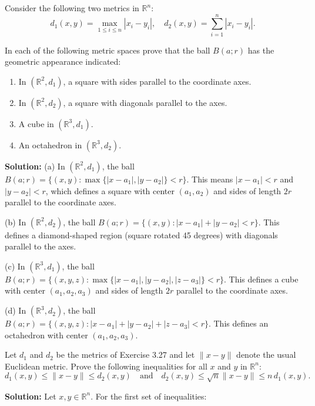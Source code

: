 \begin{problembox}
Consider the following two metrics in \( \mathbb{R}^n \):
\[d_1(x, y) = \max_{1 \leq i \leq n} |x_i - y_i|, \quad d_2(x, y) = \sum_{i=1}^n |x_i - y_i|.\]

In each of the following metric spaces prove that the ball \( B(a; r) \) has the geometric appearance indicated:
\begin{enumerate}[label=\alph*)]
\item In \( (\mathbb{R}^2, d_1) \), a square with sides parallel to the coordinate axes.
\item In \( (\mathbb{R}^2, d_2) \), a square with diagonals parallel to the axes.
\item A cube in \( (\mathbb{R}^3, d_1) \).
\item An octahedron in \( (\mathbb{R}^3, d_2) \).
\end{enumerate}
\end{problembox}

\textbf{Solution:} 
(a) In $(\mathbb{R}^2, d_1)$, the ball $B(a;r) = \{(x,y) : \max\{|x-a_1|, |y-a_2|\} < r\}$. This means $|x-a_1| < r$ and $|y-a_2| < r$, which defines a square with center $(a_1,a_2)$ and sides of length $2r$ parallel to the coordinate axes.

(b) In $(\mathbb{R}^2, d_2)$, the ball $B(a;r) = \{(x,y) : |x-a_1| + |y-a_2| < r\}$. This defines a diamond-shaped region (square rotated 45 degrees) with diagonals parallel to the axes.

(c) In $(\mathbb{R}^3, d_1)$, the ball $B(a;r) = \{(x,y,z) : \max\{|x-a_1|, |y-a_2|, |z-a_3|\} < r\}$. This defines a cube with center $(a_1,a_2,a_3)$ and sides of length $2r$ parallel to the coordinate axes.

(d) In $(\mathbb{R}^3, d_2)$, the ball $B(a;r) = \{(x,y,z) : |x-a_1| + |y-a_2| + |z-a_3| < r\}$. This defines an octahedron with center $(a_1,a_2,a_3)$.

\begin{problembox}
Let \( d_1 \) and \( d_2 \) be the metrics of Exercise 3.27 and let \( \|x - y\| \) denote the usual Euclidean metric. Prove the following inequalities for all \( x \) and \( y \) in \( \mathbb{R}^n \):
\[d_1(x, y) \leq \|x - y\| \leq d_2(x, y) \quad \text{and} \quad d_2(x, y) \leq \sqrt{n} \|x - y\| \leq n\,d_1(x, y).\]
\end{problembox}

\textbf{Solution:} Let $x, y \in \mathbb{R}^n$. For the first set of inequalities:

